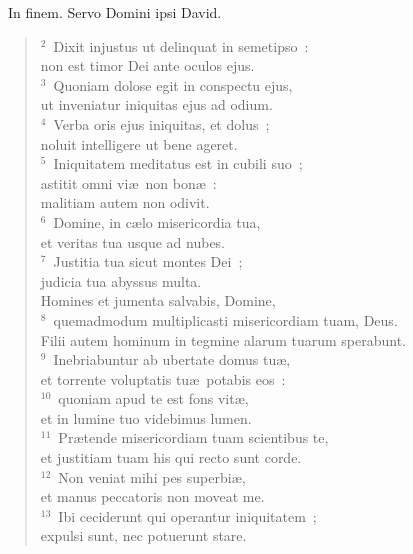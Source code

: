 ~\lettrine[lines=10,image=true,loversize=0.05,lraise=-0.03]{I}{}n finem. Servo Domini ipsi David.
\begin{flushleft}\begin{verse}\vspace{6pt}${}^{2}$~Dixit injustus ut delinquat in semetipso~:\\ non est timor Dei ante oculos ejus.\\
${}^{3}$~Quoniam dolose egit in conspectu ejus,\\ ut inveniatur iniquitas ejus ad odium.\\
${}^{4}$~Verba oris ejus iniquitas, et dolus~;\\ noluit intelligere ut bene ageret.\\
${}^{5}$~Iniquitatem meditatus est in cubili suo~;\\ astitit omni vi\ae\ non bon\ae~:\\ malitiam autem non odivit.\\
${}^{6}$~Domine, in c\ae lo misericordia tua,\\ et veritas tua usque ad nubes.\\
${}^{7}$~Justitia tua sicut montes Dei~;\\ judicia tua abyssus multa.\\ Homines et jumenta salvabis, Domine,\\
${}^{8}$~quemadmodum multiplicasti misericordiam tuam, Deus.\\ Filii autem hominum in tegmine alarum tuarum sperabunt.\\
${}^{9}$~Inebriabuntur ab ubertate domus tu\ae ,\\ et torrente voluptatis tu\ae\ potabis eos~:\\
${}^{10}$~quoniam apud te est fons vit\ae ,\\ et in lumine tuo videbimus lumen.\\
${}^{11}$~Pr\ae tende misericordiam tuam scientibus te,\\ et justitiam tuam his qui recto sunt corde.\\
${}^{12}$~Non veniat mihi pes superbi\ae ,\\ et manus peccatoris non moveat me.\\
${}^{13}$~Ibi ceciderunt qui operantur iniquitatem~;\\ expulsi sunt, nec potuerunt stare.\end{verse}\end{flushleft}


